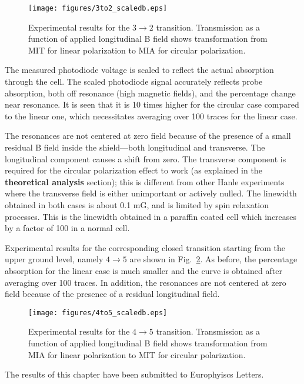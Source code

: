 \begin{enumerate}
\begin{figure}
	\centering
	\texttt{[image: figures/3to2\_scaledb.eps]}
	\caption{Experimental results for the $3\rightarrow 2 $ transition. Transmission as a function of applied longitudinal B field shows transformation from MIT for linear polarization to MIA for circular polarization.}
	\label{fig:3to2}
\end{figure}

The measured photodiode voltage is scaled to reflect the actual absorption through the cell. The scaled photodiode signal accurately reflects probe absorption, both off resonance (high magnetic fields), and the percentage change near resonance. It is seen that it is 10 times higher for the circular case compared to the linear one, which necessitates averaging over 100 traces for the linear case.

The resonances are not centered at zero field because of the presence of a small residual B field inside the shield---both longitudinal and transverse. The longitudinal component causes a shift from zero. The transverse component is required for the circular polarization effect to work (as explained in the \textbf{theoretical analysis} section); this is different from other Hanle experiments where the transverse field is either unimportant or actively nulled. The linewidth obtained in both cases is about 0.1 mG, and is limited by spin relaxation processes. This is the linewidth obtained in a paraffin coated cell which increases by a factor of 100 in a normal cell.

Experimental results for the corresponding closed transition starting from the upper ground level, namely $ 4 \rightarrow 5 $ are shown in Fig.\ \ref{fig:4to5}. As before, the percentage absorption for the linear case is much smaller and the curve is obtained after averaging over 100 traces. In addition, the resonances are not centered at zero field because of the presence of a residual longitudinal field.

\begin{figure}
	\centering
	\texttt{[image: figures/4to5\_scaledb.eps]}
	\caption{Experimental results for the $ 4\rightarrow 5 $ transition. Transmission as a function of applied longitudinal B field shows transformation from MIA for linear polarization to MIT for circular polarization.}
	\label{fig:4to5}
\end{figure}

The results of this chapter have been submitted to Europhyiscs Letters.


\end{enumerate}
